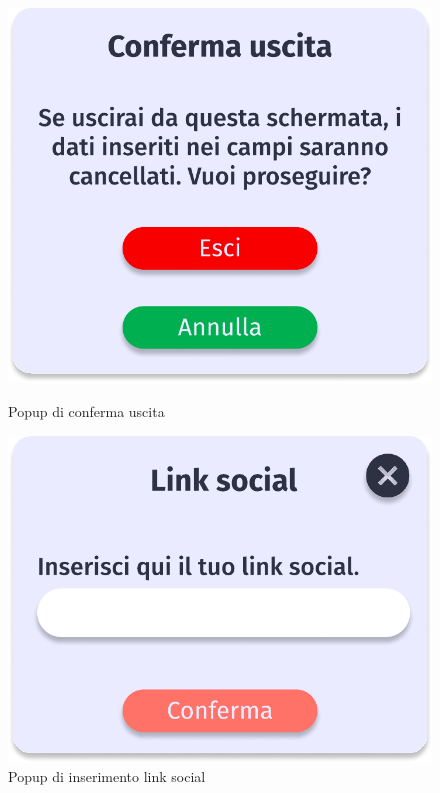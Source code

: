         \begin{figure}
            \begin{minipage}{0.32\textwidth}
                    \centering
                    \includegraphics[width=.7\linewidth]{Immagini/Frames/Popup/P6.pdf}
                    \caption{Popup di conferma uscita}
            \end{minipage}\hfill
            \begin{minipage}{0.32\textwidth}
                    \centering
                    \includegraphics[width=.7\linewidth]{Immagini/Frames/Popup/P4.pdf}
                    \caption{Popup di inserimento link social}
            \end{minipage}\hfill
        \end{figure}
        
    \clearpage
    
